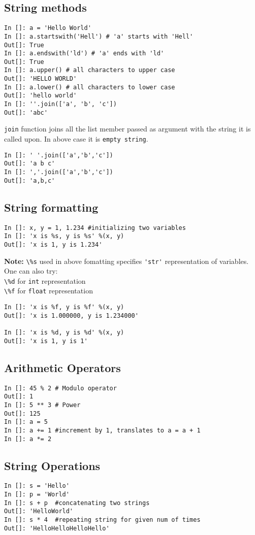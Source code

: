 \documentclass[12pt]{article}
\newcommand{\typ}[1]{\lstinline{#1}}
\begin{document}
\subsection{String methods}
  \begin{lstlisting}
In []: a = 'Hello World' 
In []: a.startswith('Hell') # 'a' starts with 'Hell'
Out[]: True
In []: a.endswith('ld') # 'a' ends with 'ld'
Out[]: True
In []: a.upper() # all characters to upper case
Out[]: 'HELLO WORLD'
In []: a.lower() # all characters to lower case
Out[]: 'hello world'
In []: ''.join(['a', 'b', 'c'])
Out[]: 'abc'
  \end{lstlisting}
\typ{join} function joins all the list member passed as argument with the string it is called upon. In above case it is \typ{empty string}.
\begin{lstlisting}
In []: ' '.join(['a','b','c'])
Out[]: 'a b c'  
In []: ','.join(['a','b','c'])
Out[]: 'a,b,c'
\end{lstlisting}
\subsection{String formatting}
  \begin{lstlisting}
In []: x, y = 1, 1.234 #initializing two variables
In []: 'x is %s, y is %s' %(x, y)
Out[]: 'x is 1, y is 1.234'
  \end{lstlisting}
\textbf{Note:} \typ{\%s} used in above fomatting specifies \typ{'str'} representation of variables. One can also try:\\
\typ{\%d} for \typ{int} representation\\
\typ{\%f} for \typ{float} representation
\begin{lstlisting}
In []: 'x is %f, y is %f' %(x, y)
Out[]: 'x is 1.000000, y is 1.234000'

In []: 'x is %d, y is %d' %(x, y)
Out[]: 'x is 1, y is 1'
\end{lstlisting}
\subsection{Arithmetic Operators}
  \begin{lstlisting}
In []: 45 % 2 # Modulo operator
Out[]: 1
In []: 5 ** 3 # Power
Out[]: 125
In []: a = 5
In []: a += 1 #increment by 1, translates to a = a + 1
In []: a *= 2
  \end{lstlisting}
\subsection{String Operations}
\begin{lstlisting}
In []: s = 'Hello'
In []: p = 'World'
In []: s + p  #concatenating two strings
Out[]: 'HelloWorld'
In []: s * 4  #repeating string for given num of times
Out[]: 'HelloHelloHelloHello'
\end{lstlisting}
\end{document}

